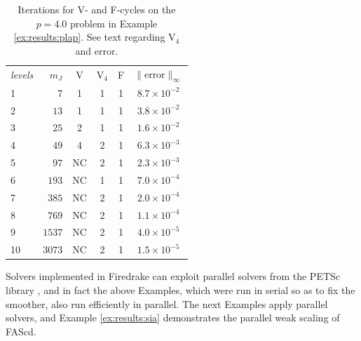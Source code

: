 \documentclass[letterpaper,final,12pt,reqno]{amsart}
\theoremstyle{cstyle}
\theoremstyle{cstyle*}
\theoremstyle{dstyle}
\numberwithin{equation}{section}
\numberwithin{figure}{section}
\numberwithin{table}{section}
\numberwithin{theorem}{section}
\begin{document}
\begin{table}[ht]
\begin{tabular}{lr@{\hskip 7mm}c@{\hskip 4mm}c@{\hskip 4mm}c@{\hskip 6mm}c}
\emph{levels} & $m_J$ & V & V$_4$ & F & $\|$error$\|_\infty$ \\ \cmidrule{1-6}
 1 &    $7$ &  1 &  1 &  1 & $8.7 \times 10^{-2}$ \\
 2 &   $13$ &  1 &  1 &  1 & $3.8 \times 10^{-2}$ \\
 3 &   $25$ &  2 &  1 &  1 & $1.6 \times 10^{-2}$ \\
 4 &   $49$ &  4 &  2 &  1 & $6.3 \times 10^{-3}$ \\
 5 &   $97$ & NC &  2 &  1 & $2.3 \times 10^{-3}$ \\
 6 &  $193$ & NC &  1 &  1 & $7.0 \times 10^{-4}$ \\
 7 &  $385$ & NC &  2 &  1 & $2.0 \times 10^{-4}$ \\
 8 &  $769$ & NC &  2 &  1 & $1.1 \times 10^{-4}$ \\
 9 & $1537$ & NC &  2 &  1 & $4.0 \times 10^{-5}$ \\
10 & $3073$ & NC &  2 &  1 & $1.5 \times 10^{-5}$
\end{tabular}
\bigskip
\caption{Iterations for V- and F-cycles on the $p=4.0$ problem in Example \ref{ex:results:plap}.  See text regarding V$_4$ and error.}
\label{tab:results:degenerateplap1d}
\end{table}

Solvers implemented in Firedrake can exploit parallel solvers from the PETSc library \cite{Balayetal2023}, and in fact the above Examples, which were run in serial so as to fix the smoother, also run efficiently in parallel.  The next Examples apply parallel solvers, and Example \ref{ex:results:sia} demonstrates the parallel weak scaling \cite{Bueler2021} of FAScd.
\end{document}

